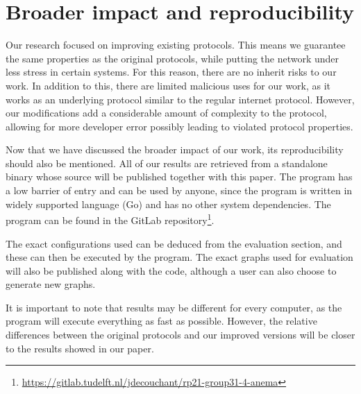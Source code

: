 \section{Broader impact and reproducibility}
\label{broader-impact}

Our research focused on improving existing protocols. This means we guarantee the same properties as the original protocols, while putting the network under less stress in certain systems. For this reason, there are no inherit risks to our work. In addition to this, there are limited malicious uses for our work, as it works as an underlying protocol similar to the regular internet protocol. 
However, our modifications add a considerable amount of complexity to the protocol, allowing for more developer error possibly leading to violated protocol properties.


Now that we have discussed the broader impact of our work, its reproducibility should also be mentioned. All of our results are retrieved from a standalone binary whose source will be published together with this paper. The program has a low barrier of entry and can be used by anyone, since the program is written in widely supported language (Go) and has no other system dependencies. The program can be found in the GitLab repository\footnote{\url{https://gitlab.tudelft.nl/jdecouchant/rp21-group31-4-anema}}.

The exact configurations used can be deduced from the evaluation section, and these can then be executed by the program. The exact graphs used for evaluation will also be published along with the code, although a user can also choose to generate new graphs. 

It is important to note that results may be different for every computer, as the program will execute everything as fast as possible. However, the relative differences between the original protocols and our improved versions will be closer to the results showed in our paper.

